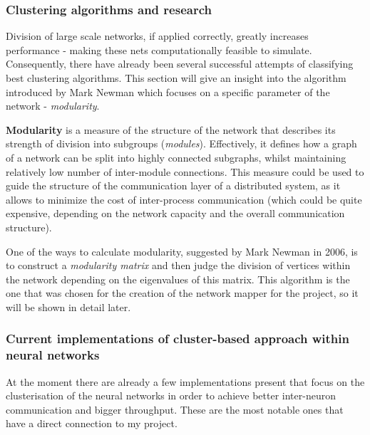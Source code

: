 \subsubsection{Clustering algorithms and research}

Division of large scale networks, if applied correctly, greatly increases performance - making these nets computationally feasible to simulate. Consequently, there have already been several successful attempts of classifying best clustering algorithms. This section will give an insight into the algorithm introduced by Mark Newman which focuses on a specific parameter of the network - \emph{modularity}.

\textbf{Modularity} is a measure of the structure of the network that describes its strength of division into subgroups (\emph{modules}).\cite{Newman2004} Effectively, it defines how a graph of a network can be split into highly connected subgraphs, whilst maintaining relatively low number of inter-module connections. This measure could be used to guide the structure of the communication layer of a distributed system, as it allows to minimize the cost of inter-process communication (which could be quite expensive, depending on the network capacity and the overall communication structure).

One of the ways to calculate modularity, suggested by Mark Newman in 2006\cite{Newman2006}, is to construct a \emph{modularity matrix} and then judge the division of vertices within the network depending on the eigenvalues of this matrix. This algorithm is the one that was chosen for the creation of the network mapper for the project, so it will be shown in detail later.

\subsubsection{Current implementations of cluster-based approach within neural networks}
At the moment there are already a few implementations present that focus on the clusterisation of the neural networks in order to achieve better inter-neuron communication and bigger throughput. 
These are the most notable ones that have a direct connection to my project.

